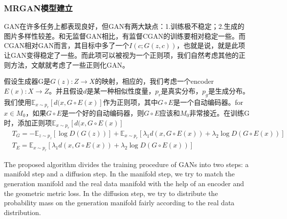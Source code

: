         \subsubsection{MRGAN模型建立}
            \par
            GAN在许多任务上都表现良好，但GAN有两大缺点：1.训练极不稳定；2.生成的图片多样性较差。和无监督GAN相比，有监督CGAN的训练要相对稳定一些。而CGAN相对GAN而言，其目标中多了一个$I(c;G(z,c))$，也就是说，就是此项让GAN变得稳定了一些。而此项可以被视为一个正则项，我们自然考虑其他的正则方法，文献\cite{2016.Tong}就考虑了一些正则化GAN。
            \par
            假设生成器G是$G(z):Z\to X$的映射，相应的，我们考虑一个encoder $E(x):X\to Z$。并且假设$d$是某一种相似性度量，$p_r$是真实分布，$p_g$是生成分布。我们使用$\mathbb{E}_{x\sim p_r}[d(x,G\circ E(x)]$作为正则项，其中$G\circ E$是一个自动编码器。for $x\in M_0$，如果$G\circ E$是一个好的自动编码器，则$G\circ E$应该和$M_0$非常接近。在训练G时，添加正则项$\mathbb{E}_{x\sim p_r}[d(x,G\circ E(x)]$
            \begin{align*}
            & T_G = -\mathbb{E}_{z\sim p_z}[\log D(G(z))] +\mathbb{E}_{x\sim p_r}[\lambda_1 d(x,G\circ E(x))+\lambda_2\log D(G\circ E(x))]\\
            & T_E = \mathbb{E}_{x\sim p_r}[\lambda_1d(x,G\circ E(x))+ \lambda_2\log D(G\circ E(x))]
            \end{align*}
            \par
            The proposed algorithm divides the training procedure of GANs into two steps: a manifold step and a diffusion step. In the manifold step, we try to match the generation manifold and the real data manifold with the help of an encoder and the geometric metric loss. In the diffusion step, we try to distribute the probability mass on the generation manifold fairly according to the real data distribution.

